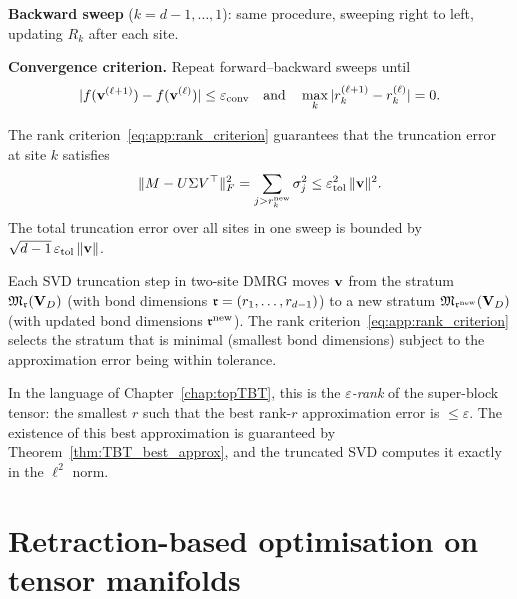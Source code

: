 \noindent\textbf{Backward sweep} ($k = d-1, \ldots, 1$): same procedure,
sweeping right to left, updating $R_k$ after each site.

\noindent\textbf{Convergence criterion.} Repeat forward--backward sweeps
until
\begin{equation}
    |f(\mathbf{v}^{(\ell+1)}) - f(\mathbf{v}^{(\ell)})| \leq \varepsilon_{\mathrm{conv}}
    \quad\text{and}\quad
    \max_k |r_k^{(\ell+1)} - r_k^{(\ell)}| = 0.
\end{equation}

\begin{proposition}
\label{prop:app:dmrg_rank}
The rank criterion~\eqref{eq:app:rank_criterion} guarantees that the
truncation error at site $k$ satisfies
\begin{equation}
    \|M - U\Sigma V^\top\|_F^2
    = \sum_{j > r_k^{\mathrm{new}}} \sigma_j^2
    \leq \varepsilon_{\mathrm{tol}}^2\,\|\mathbf{v}\|^2.
\end{equation}
The total truncation error over all sites in one sweep is bounded by
$\sqrt{d-1}\,\varepsilon_{\mathrm{tol}}\,\|\mathbf{v}\|$.
\end{proposition}

\begin{remark}
\label{rem:app:dmrg_geometry}
Each SVD truncation step in two-site DMRG moves $\mathbf{v}$ from the stratum
$\mathfrak{M}_{\mathfrak{r}}(\mathbf{V}_D)$ (with bond dimensions $\mathfrak{r} = (r_1, \ldots, r_{d-1})$)
to a new stratum $\mathfrak{M}_{\mathfrak{r}^{\mathrm{new}}}(\mathbf{V}_D)$ (with updated bond
dimensions $\mathfrak{r}^{\mathrm{new}}$). The rank criterion~\eqref{eq:app:rank_criterion}
selects the stratum that is minimal (smallest bond dimensions) subject
to the approximation error being within tolerance.

In the language of Chapter~\ref{chap:topTBT}, this is the
\emph{$\varepsilon$-rank} of the super-block tensor: the smallest $r$
such that the best rank-$r$ approximation error is $\leq \varepsilon$.
The existence of this best approximation is guaranteed by
Theorem~\ref{thm:TBT_best_approx}, and the truncated SVD computes it
exactly in the $\ell^2$ norm.
\end{remark}

\section{Retraction-based optimisation on tensor manifolds}
\label{app:alg:retraction}

